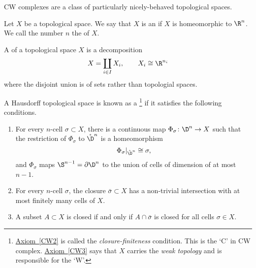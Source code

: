 \documentclass[main.tex]{subfiles}
\begin{document}
CW complexes are a class of particularly nicely-behaved topological spaces.

\begin{definition}[cell]
  \label{def:cell}
  Let $X$ be a topological space. We say that $X$ is an  if $X$ is homeomorphic to $\R^{n}$. We call the number $n$ the  of $X$.
\end{definition}

\begin{definition}
  \label{def:cell_decomposition}
  A  of a topological space $X$ is a decomposition
  \begin{equation*}
    X = \coprod_{i \in I} X_{i},\qquad X_{i} \cong \R^{n_{i}}
  \end{equation*}
  where the disjoint union is of sets rather than topologial spaces.
\end{definition}

\begin{definition}[CW complex]
  \label{def:cw_complex}
  A Hausdorff topological space is known as a \footnote{\hyperref[CW2]{Axiom~\ref*{CW2}} is called the \emph{closure-finiteness} condition. This is the `C' in CW complex. \hyperref[CW3]{Axiom~\ref*{CW3}} says that $X$ carries the \emph{weak topology} and is responsible for the `W'.} if it satisfies the following conditions.
  \begin{enumerate}[label=(CW\arabic*), leftmargin=*]
    \item \label{CW1} For every $n$-cell $\sigma \subset X$, there is a continuous map $\Phi_{\sigma}\colon \D^{n} \to X$ such that the restriction of $\Phi_{\sigma}$ to $\mathring{\D}^{n}$ is a homeomorphism
      \begin{equation*}
        \left. \Phi_{\sigma} \right|_{\mathring{\D}^{n}} \cong \sigma,
      \end{equation*}
      and $\Phi_{\sigma}$ maps $\S^{n-1} = \partial \D^{n}$ to the union of cells of dimension of at most $n-1$.

    \item \label{CW2} For every $n$-cell $\sigma$, the closure $\bar{\sigma} \subset X$ has a non-trivial intersection with at most finitely many cells of $X$.

    \item \label{CW3} A subset $A \subset X$ is closed if and only if $A \cap \bar{\sigma}$ is closed for all cells $\sigma \in X$.
  \end{enumerate}
\end{definition}
\end{document}
